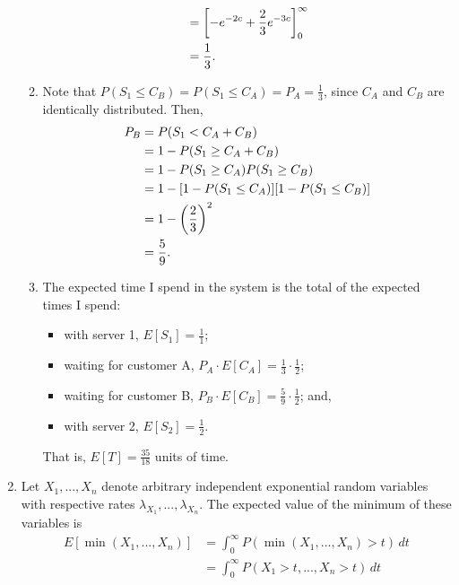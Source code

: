 \documentclass{article}
\begin{document}
\begin{enumerate}
\begin{enumerate}
\[\begin{split}
            & = \left[-e^{-2c} + \frac{2}{3}e^{-3c}\right]_0^\infty \\
            & = \frac{1}{3}\text. \\
        \end{split}\]
    \item
        Note that $P(S_1 \leq C_B) = P(S_1 \leq C_A) = P_A = \frac{1}{3}$, since $C_A$ and $C_B$ are identically distributed. Then,
        \[\begin{split}
        P_B & = P( S_1 < C_A + C_B ) \\
            & = 1 - P( S_1 \geq C_A + C_B ) \\
            & = 1 - P( S_1 \geq C_A )P(S_1 \geq C_B ) \\
            & = 1 - [ 1 - P(S_1 \leq C_A) ][ 1 - P(S_1 \leq C_B) ] \\
            & = 1 - \left(\frac{2}{3}\right)^2 \\
            & = \frac{5}{9}\text.
        \end{split}\]
    \item
        The expected time I spend in the system is the total of the expected times I spend:
        \begin{itemize}
        \item with server 1, $E[S_1]=\frac{1}{1}$;
        \item waiting for customer A, $P_A\cdot E[C_A]=\frac{1}{3}\cdot\frac{1}{2}$;
        \item waiting for customer B, $P_B\cdot E[C_B]=\frac{5}{9}\cdot\frac{1}{2}$; and,
        \item with server 2, $E[S_2]=\frac{1}{2}$.
        \end{itemize}
        That is, $E[T]=\frac{35}{18}$ units of time.
    \end{enumerate}
\item
    Let $X_1, ..., X_n$ denote arbitrary independent exponential random variables with respective rates $\lambda_{X_1}, ..., \lambda_{X_n}$.
    The expected value of the minimum of these variables is
    \begin{equation}\label{eq:exp_minexpirv}\begin{split}
    E[\min(X_1, ..., X_n)]    & = \int_0^\infty P( \min(X_1, ..., X_n) > t )\, dt \\
                                    & = \int_0^\infty P( X_1 > t, ..., X_n > t )\, dt \\

\end{split}
\end{equation}
\end{enumerate}
\end{document}

